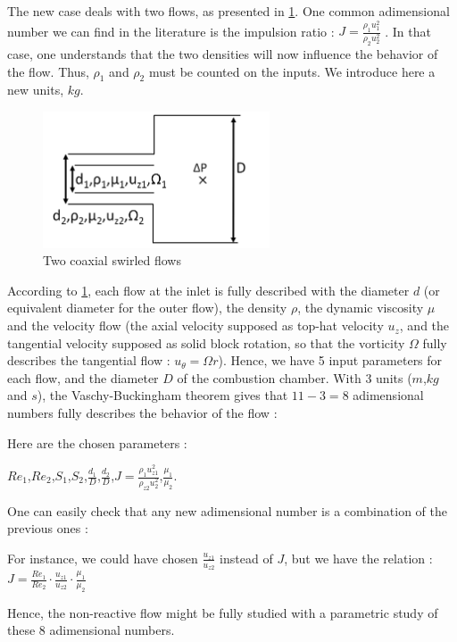 The new case deals with two flows, as presented in \ref{Vaschy4}. One common adimensional number we can find in the literature is the impulsion ratio : $J=\frac{\rho_{1} u_{1}^2}{\rho_{2} u_{2}^2}$ . In that case, one understands that the two densities will now influence the behavior of the flow. Thus, $\rho_{1}$ and $\rho_{2}$ must be counted on the inputs. We introduce here a new units, $kg$. 
\begin{figure}[!h]
  \centering
\includegraphics[width=0.6\textwidth]{fig/Schema_Vashy4.png}
  \caption{Two coaxial swirled flows}
 \label{Vaschy4}
\end{figure}
According to \ref{Vaschy4}, each flow at the inlet is fully described with the diameter $d$ (or equivalent diameter for the outer flow), the density $\rho$, the dynamic viscosity $\mu$ and the velocity flow (the axial velocity supposed as top-hat velocity $u_{z}$, and the tangential velocity supposed as solid block rotation, so that the vorticity $\Omega$ fully describes the tangential flow :  $u_{\theta}=\Omega r$). Hence, we have 5 input parameters for each flow, and the diameter $D$ of the combustion chamber. With 3 units ($m$,$kg$ and $s$), the Vaschy-Buckingham theorem gives that $11-3=8$ adimensional numbers fully describes the behavior of the flow :

Here are the chosen parameters : 

$Re_{1}$,$Re_{2}$,$S_{1}$,$S_{2}$,$\frac{d_{1}}{D}$,$\frac{d_{2}}{D}$,$J=\frac{\rho_{1} u_{z1}^2}{\rho_{z2} u_{2}^2}$,$\frac{\mu_{1}}{\mu_{2}}$. 

One can easily check that any new adimensional number is a combination of the previous ones : 

For instance, we could have chosen $\frac{u_{z1}}{u_{z2}}$ instead of $J$, but we have the relation : $J=\frac{Re_{1}}{Re_{2}} \cdot \frac{u_{z1}}{u_{z2}} \cdot \frac{\mu_{1}}{\mu_{2}}$ 

Hence, the non-reactive flow might be fully studied with a parametric study of these 8 adimensional numbers.

